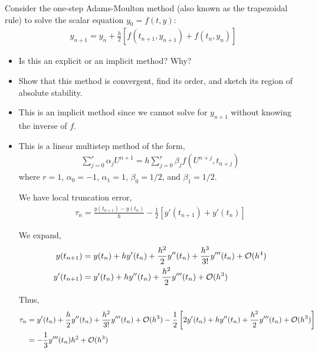 \documentclass[10pt]{article}
\begin{document}
\begin{problem}
Consider the one-step Adams-Moulton method (also known as the trapezoidal rule) to
solve the scalar equation \( y_0 = f(t, y) \):
\begin{align*}
    y_{n+1} = y_n + \frac{h}{2} \left[ f(t_{n+1},y_{n+1}) + f(t_n,y_n) \right]
\end{align*}
\begin{itemize}[nolistsep]
\item Is this an explicit or an implicit method? Why?
\item Show that this method is convergent, find its order, and sketch its region of absolute stability.
\end{itemize}
\end{problem}

\begin{solution}[Solution]
\begin{itemize}
\item This is an implicit method since we cannot solve for \( y_{n+1} \) without knowing the inverse of \( f \).
\item This is a linear multistep method of the form,
    \begin{align*}
        \sum_{j=0}^{r} \alpha_{j} U^{n+1} = h\sum_{j=0}^{r} \beta_j f(U^{n+j},t_{n+j})
    \end{align*}
        where \( r = 1 \), \( \alpha_0 = -1 \), \( \alpha_1 = 1 \), \( \beta_0 = 1/2 \), and \( \beta_1 = 1/2 \).

We have local truncation error,
\begin{align*}
    \tau_n = \frac{y(t_{n+1}) - y(t_n)}{h} - \frac{1}{2} \left[ y'(t_{n+1}) + y'(t_n) \right]
\end{align*}

We expand,
\begin{align*}
    y(t_{n+1}) &= y(t_n) + h y'(t_n) + \frac{h^2}{2} y''(t_n) + \frac{h^3}{3!} y'''(t_n) + \mathcal{O}(h^4) \\
    y'(t_{n+1}) &= y'(t_n) + h y''(t_n) + \frac{h^2}{2} y'''(t_n) + \mathcal{O}(h^3) \\
\end{align*}

Thus,
\begin{align*}
    \tau_n &= y'(t_n) + \frac{h}{2} y''(t_n) + \frac{h^2}{3!}y'''(t_n) + \mathcal{O}(h^3) - \frac{1}{2} \left[ 2y'(t_n) + hy''(t_n) + \frac{h^2}{2} y'''(t_n) + \mathcal{O}(h^3) \right] \\
    &= -\frac{1}{3} y'''(t_n) h^2 + \mathcal{O}(h^3)
\end{align*}


\end{itemize}
\end{solution}
\end{document}
